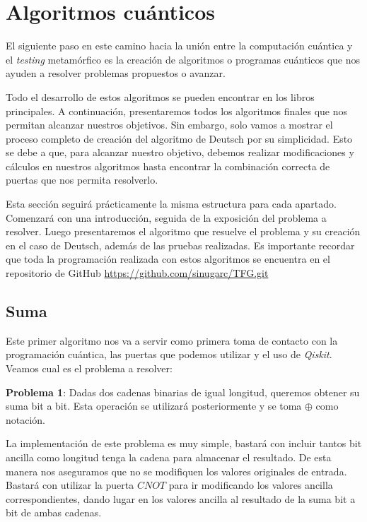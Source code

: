 \cleardoublepage

\chapter{Algoritmos cuánticos}
\label{Cap3:Algoritmos}

El siguiente paso en este camino hacia la unión entre la computación cuántica y el \textit{testing} metamórfico es la creación de algoritmos o programas cuánticos que nos ayuden a resolver problemas propuestos o avanzar. \newline

Todo el desarrollo de estos algoritmos se pueden encontrar en los libros principales\cite{B:Nielsen:2002}\cite{B:QuantumScientist:2008}. A continuación, presentaremos todos los algoritmos finales que nos permitan alcanzar nuestros objetivos. Sin embargo, solo vamos a mostrar el proceso completo de creación del algoritmo de Deutsch por su simplicidad. Esto se debe a que, para alcanzar nuestro objetivo, debemos realizar modificaciones y cálculos en nuestros algoritmos hasta encontrar la combinación correcta de puertas que nos permita resolverlo.\newline

Esta sección seguirá prácticamente la misma estructura para cada apartado. Comenzará con una introducción, seguida de la exposición del problema a resolver. Luego presentaremos el algoritmo que resuelve el problema y su creación en el caso de Deutsch, además de las pruebas realizadas. Es importante recordar que toda la programación realizada con estos algoritmos se encuentra en el repositorio de GitHub \url{https://github.com/sinugarc/TFG.git}

\section{Suma}
\label{Sec3.1:Suma}
 Este primer algoritmo nos va a servir como primera toma de contacto con la programación cuántica, las puertas que podemos utilizar y el uso de \textit{Qiskit}. Veamos cual es el problema a resolver:\newline

 \textbf{Problema 1}: Dadas dos cadenas binarias de igual longitud, queremos obtener su suma bit a bit. Esta operación se utilizará posteriormente y se toma $\oplus$ como notación. \newpage

 La implementación de este problema es muy simple, bastará con incluir tantos bit ancilla como longitud tenga la cadena para almacenar el resultado. De esta manera nos aseguramos que no se modifiquen los valores originales de entrada. Bastará con utilizar la puerta $CNOT$ para ir modificando los valores ancilla correspondientes, dando lugar en los valores ancilla al resultado de la suma bit a bit de ambas cadenas.\newline


